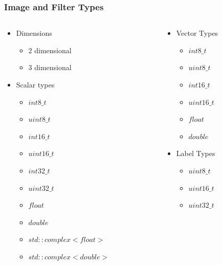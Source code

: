 \begin{frame}[fragile]
\frametitle{Image and Filter Types}
\begin{columns}
  \begin{column}{0.5\textwidth}
    \begin{itemize}
      \item Dimensions
      \begin{itemize}
        \item 2 dimensional
        \item 3 dimensional
      \end{itemize}
      \item Scalar types
      \begin{itemize}
        \item $int8\_t$
        \item $uint8\_t$
        \item $int16\_t$
        \item $uint16\_t$
        \item $int32\_t$
        \item $uint32\_t$
        \item $float$
        \item $double$
        \item $std::complex< float >$
        \item $std::complex< double >$
      \end{itemize}
    \end{itemize}
  \end{column}

  \begin{column}{0.5\textwidth}
     \begin{itemize}
       \item Vector Types
       \begin{itemize}
         \item $int8\_t$
         \item $uint8\_t$
         \item $int16\_t$
         \item $uint16\_t$
         \item $float$
         \item $double$
       \end{itemize}
       \item Label Types
       \begin{itemize}
         \item $uint8\_t$
         \item $uint16\_t$
         \item $uint32\_t$
       \end{itemize}
    \end{itemize}
  \end{column}
\end{columns}
\end{frame}

